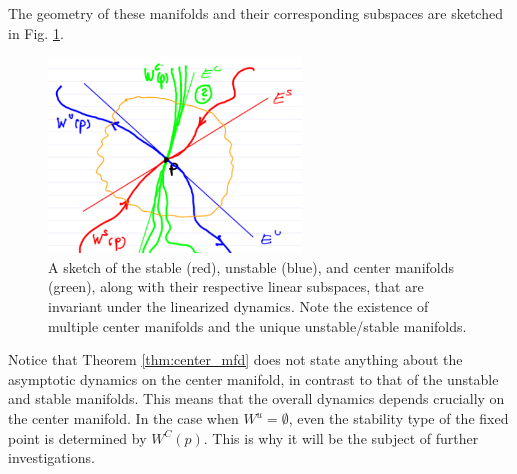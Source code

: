 The geometry of these manifolds and their corresponding subspaces are sketched in Fig. \ref{fig:mfds_def}.
\begin{figure}[h!]
	\centering
	\includegraphics[width=0.6\textwidth]{figures/ch3/1manifolds_def.png}
	\caption{A sketch of the stable (red), unstable (blue), and center manifolds (green), along with their respective linear subspaces, that are invariant under the linearized dynamics. Note the existence of multiple center manifolds and the unique unstable/stable manifolds.}
	\label{fig:mfds_def}
\end{figure}

Notice that Theorem \ref{thm:center_mfd} does not state anything  about the asymptotic dynamics on the center manifold, in contrast to that of the unstable and stable manifolds. This means that the overall dynamics depends crucially on the center manifold. In the case when $W^u=\emptyset$, even the stability type of the fixed point is determined by $W^C(p)$. This is why it will be the subject of further investigations.

